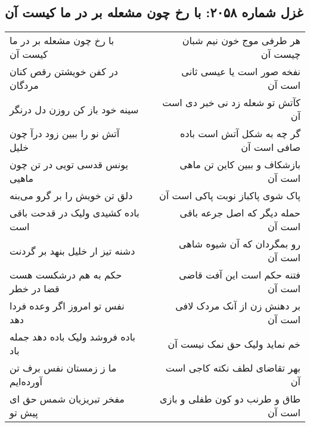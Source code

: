 \begin{center}
\section*{غزل شماره ۲۰۵۸: با رخ چون مشعله بر در ما کیست آن}
\label{sec:2058}
\begin{longtable}{l p{0.5cm} r}
با رخ چون مشعله بر در ما کیست آن
&&
هر طرفی موج خون نیم شبان چیست آن
\\
در کفن خویشتن رقص کنان مردگان
&&
نفخه صور است یا عیسی ثانی است آن
\\
سینه خود باز کن روزن دل درنگر
&&
کآتش تو شعله زد نی خبر دی است آن
\\
آتش نو را ببین زود درآ چون خلیل
&&
گر چه به شکل آتش است باده صافی است آن
\\
یونس قدسی تویی در تن چون ماهیی
&&
بازشکاف و ببین کاین تن ماهی است آن
\\
دلق تن خویش را بر گرو می‌بنه
&&
پاک شوی پاکباز نوبت پاکی است آن
\\
باده کشیدی ولیک در قدحت باقی است
&&
حمله دیگر که اصل جرعه باقی است آن
\\
دشنه تیز ار خلیل بنهد بر گردنت
&&
رو بمگردان که آن شیوه شاهی است آن
\\
حکم به هم درشکست هست قضا در خطر
&&
فتنه حکم است این آفت قاضی است آن
\\
نفس تو امروز اگر وعده فردا دهد
&&
بر دهنش زن از آنک مردک لافی است آن
\\
باده فروشد ولیک باده دهد جمله باد
&&
خم نماید ولیک حق نمک نیست آن
\\
ما ز زمستان نفس برف تن آورده‌ایم
&&
بهر تقاضای لطف نکته کاجی است آن
\\
مفخر تبریزیان شمس حق ای پیش تو
&&
طاق و طرنب دو کون طفلی و بازی است آن
\\
\end{longtable}
\end{center}

